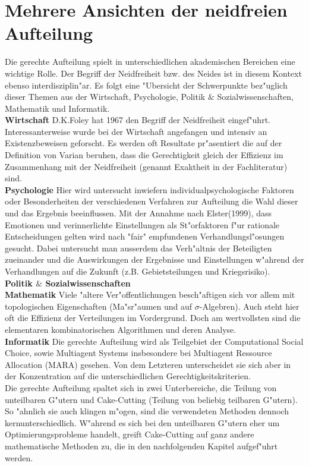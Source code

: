 \documentclass[11pt, a4paper, twoside]{article}
\numberwithin{equation}{section}
\begin{document}
\section{Mehrere Ansichten der neidfreien Aufteilung}
Die gerechte Aufteilung spielt in unterschiedlichen akademischen Bereichen eine wichtige Rolle. Der Begriff der Neidfreiheit bzw. des Neides ist in diesem Kontext ebenso interdisziplin"ar. Es folgt eine "Ubersicht der Schwerpunkte  bez"uglich dieser Themen aus der Wirtschaft, Psychologie, Politik $\&$ Sozialwissenschaften, Mathematik und Informatik.\\
\textbf{Wirtschaft}
D.K.Foley hat 1967 den Begriff der Neidfreiheit eingef"uhrt. 
Interessanterweise wurde bei der Wirtschaft angefangen und intensiv an Existenzbeweisen geforscht. Es werden oft Resultate pr"asentiert die auf der Definition von Varian beruhen, dass die Gerechtigkeit gleich der Effizienz im Zusammenhang mit der Neidfreiheit (genannt Exaktheit in der Fachliteratur) sind.\\
\textbf{Psychologie}
Hier wird untersucht inwiefern individualpsychologische Faktoren oder Besonderheiten der verschiedenen Verfahren zur Aufteilung die Wahl dieser und das Ergebnis beeinflussen. Mit der Annahme nach Elster(1999), dass Emotionen und verinnerlichte Einstellungen als St"orfaktoren f"ur rationale Entscheidungen gelten wird nach "fair" empfundenen Verhandlungsl"osungen gesucht. Dabei untersucht man ausserdem das Verh"altnis der Beteiligten zueinander und die Auswirkungen der Ergebnisse und Einstellungen w"ahrend der Verhandlungen auf die Zukunft (z.B. Gebietsteilungen und Kriegsrisiko).\\ 
\textbf{Politik $\&$ Sozialwissenschaften}\\
\textbf{Mathematik}
Viele "altere Ver"offentlichungen besch"aftigen sich vor allem mit topologischen Eigenschaften (Ma"sr"aumen und auf $\sigma$-Algebren). Auch steht hier oft die Effizienz der Verteilungen im Vordergrund. Doch am wertvollsten sind die elementaren kombinatorischen Algorithmen %
und deren Analyse.\\
\textbf{Informatik}
Die gerechte Aufteilung wird als Teilgebiet der Computational Social Choice, sowie Multiagent Systems insbesondere bei Multiagent Ressource Allocation (MARA) gesehen. Von dem Letzteren unterscheidet sie sich aber in der Konzentration auf die unterschiedlichen Gerechtigkeitskriterien.\\
Die gerechte Aufteilung spaltet sich in zwei Unterbereiche, die Teilung von unteilbaren G"utern und Cake-Cutting (Teilung von beliebig teilbaren G"utern). So "ahnlich sie auch klingen m"ogen, sind die verwendeten Methoden dennoch kernunterschiedlich. W"ahrend es sich bei den unteilbaren G"utern eher um Optimierungsprobleme handelt, greift Cake-Cutting auf ganz andere mathematische Methoden zu, die in den nachfolgenden Kapitel aufgef"uhrt werden.
\newpage
\end{document}

